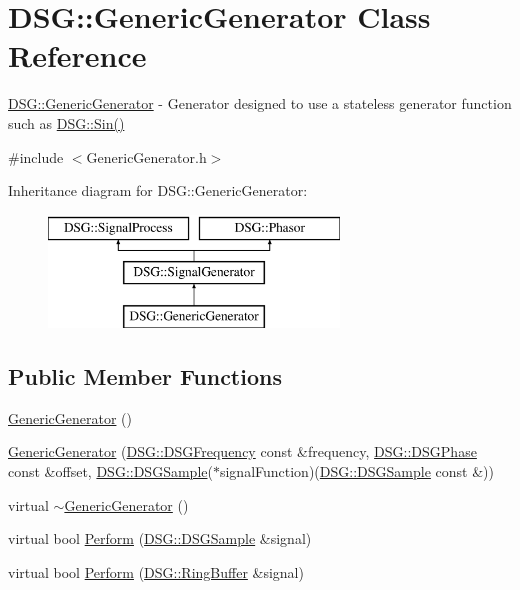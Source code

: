 \hypertarget{class_d_s_g_1_1_generic_generator}{\section{D\+S\+G\+:\+:Generic\+Generator Class Reference}
\label{class_d_s_g_1_1_generic_generator}
}


\hyperlink{class_d_s_g_1_1_generic_generator}{D\+S\+G\+::\+Generic\+Generator} -\/ Generator designed to use a stateless generator function such as \hyperlink{namespace_d_s_g_aad63d316081c7d13a551acf346ee2749}{D\+S\+G\+::\+Sin()}  




{\ttfamily \#include $<$Generic\+Generator.\+h$>$}

Inheritance diagram for D\+S\+G\+:\+:Generic\+Generator\+:\begin{figure}[H]
\begin{center}
\leavevmode
\includegraphics[height=3.000000cm]{class_d_s_g_1_1_generic_generator}
\end{center}
\end{figure}
\subsection*{Public Member Functions}
\begin{DoxyCompactItemize}
\item 
\hyperlink{class_d_s_g_1_1_generic_generator_a560df325ce43fa9a1baf4463ccaed2d3}{Generic\+Generator} ()
\item 
\hyperlink{class_d_s_g_1_1_generic_generator_a1dbab25aa71cb7bce7e4b02be5122244}{Generic\+Generator} (\hyperlink{namespace_d_s_g_a4315a061386fa1014fda09b15d3a6973}{D\+S\+G\+::\+D\+S\+G\+Frequency} const \&frequency, \hyperlink{namespace_d_s_g_a44431ce1eb0a7300efdd207bc879e52c}{D\+S\+G\+::\+D\+S\+G\+Phase} const \&offset, \hyperlink{namespace_d_s_g_ac39a94cd27ebcd9c1e7502d0c624894a}{D\+S\+G\+::\+D\+S\+G\+Sample}($\ast$signal\+Function)(\hyperlink{namespace_d_s_g_ac39a94cd27ebcd9c1e7502d0c624894a}{D\+S\+G\+::\+D\+S\+G\+Sample} const \&))
\item 
virtual \hyperlink{class_d_s_g_1_1_generic_generator_aeaca1efdba7186a8b3b1879b092e7bec}{$\sim$\+Generic\+Generator} ()
\item 
virtual bool \hyperlink{class_d_s_g_1_1_generic_generator_addcd9abbbf0e31f0af2ff18217a08302}{Perform} (\hyperlink{namespace_d_s_g_ac39a94cd27ebcd9c1e7502d0c624894a}{D\+S\+G\+::\+D\+S\+G\+Sample} \&signal)
\item 
virtual bool \hyperlink{class_d_s_g_1_1_generic_generator_a886544537d2f77243ec42dad9f124a8d}{Perform} (\hyperlink{class_d_s_g_1_1_ring_buffer}{D\+S\+G\+::\+Ring\+Buffer} \&signal)
\end{DoxyCompactItemize}
